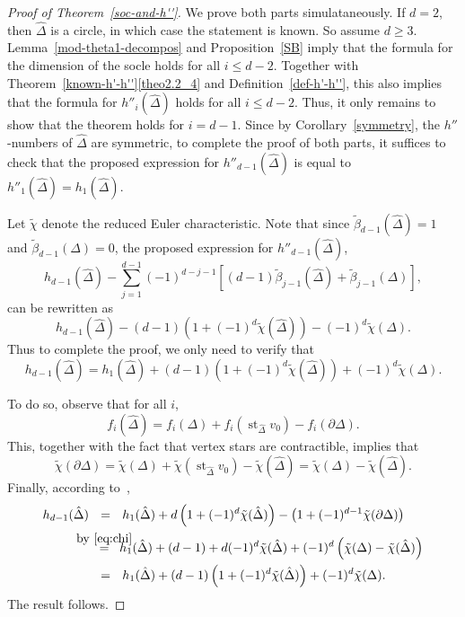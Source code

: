 \documentclass[10pt]{amsart}
\theoremstyle{definition}
\DeclareMathOperator\st{st}
\newcommand{\complet}[1]{\hat{#1}}
\begin{document}
\begin{proof}[Proof of Theorem~\ref{soc-and-h''}]
We prove both parts simulataneously. If $d=2$, then $\complet{\Delta}$ is a circle, in which case the statement is known. So assume $d\geq 3$. Lemma~\ref{mod-theta1-decompos} and Proposition~\ref{SB} imply that the formula for the dimension of the socle holds for all $i\leq d-2$. Together with Theorem~\ref{known-h'-h''}\eqref{theo2.2_4} and Definition~\ref{def-h'-h''}, this also implies that the formula for $h''_i(\complet{\Delta})$ holds for all $i\leq d-2$. Thus, it only remains to show that the theorem holds for $i=d-1$. Since by Corollary~\ref{symmetry}, the $h''$-numbers of $\complet{\Delta}$ are symmetric, to complete the proof of both parts, it suffices to check that the proposed expression for $h''_{d-1}(\complet{\Delta})$ is equal to $h''_1(\complet{\Delta})=h_1(\complet{\Delta})$.

Let $\tilde{\chi}$ denote the reduced Euler characteristic. Note that since $\tilde{\beta}_{d-1}(\complet{\Delta})=1$ and $\tilde{\beta}_{d-1}(\Delta)=0$, the proposed expression for $h''_{d-1}(\complet{\Delta})$, 
\[
h_{d-1}(\complet{\Delta})-\sum_{j=1}^{d-1}(-1)^{d-j-1}\left[(d-1)\tilde{\beta}_{j-1}(\complet{\Delta})+\tilde{\beta}_{j-1}(\Delta)\right],
\]
 can be rewritten as
\[
h_{d-1}(\complet{\Delta})- (d-1)\left(1+(-1)^d\tilde{\chi}(\complet{\Delta})\right)-(-1)^d\tilde{\chi}(\Delta).
\]
Thus to complete the proof, we only need to verify that 
\[
h_{d-1}(\complet{\Delta})=h_{1}(\complet{\Delta})+(d-1)\left(1+(-1)^d\tilde{\chi}(\complet{\Delta})\right)+(-1)^d\tilde{\chi}(\Delta).
\]

To do so, observe that for all $i$,
\[
f_i(\complet{\Delta})=f_i(\Delta)+f_i(\st_{\complet{\Delta}} v_0)- f_i(\partial\Delta).
\]
This, together with the fact that vertex stars are contractible, implies that
\begin{equation} \label{eq:chi}
\tilde{\chi}(\partial\Delta)=\tilde{\chi}(\Delta)+\tilde{\chi}(\st_{\complet{\Delta}} v_0)-\tilde{\chi}(\complet{\Delta})=
\tilde{\chi}(\Delta)-\tilde{\chi}(\complet{\Delta}).
\end{equation}
Finally, according to~\cite[Theorem~3.1]{Novik-Swartz-12},
\begin{align*}
 h_{d-1}(\complet{\Delta})&\ \ = \ \ h_{1}(\complet{\Delta})+d\left(1+(-1)^d\tilde{\chi}(\complet{\Delta})\right)-\left(1+(-1)^{d-1}\tilde{\chi}(\partial\Delta)\right)\\
& \ \ \mathop{=}^{\hbox to 0pt {\hss\scriptsize by~\eqref{eq:chi}\hss}} \ \ 
h_{1}(\complet{\Delta})+(d-1)+ d(-1)^d \tilde{\chi}(\complet{\Delta})+(-1)^d\left(\tilde{\chi}(\Delta)-\tilde{\chi}(\complet{\Delta})\right)\\
&\ \ = \ \ h_{1}(\complet{\Delta})+(d-1)\left(1+(-1)^d\tilde{\chi}(\complet{\Delta})\right)+(-1)^d\tilde{\chi}(\Delta).
\end{align*}
The result follows.
\end{proof}
\end{document}
